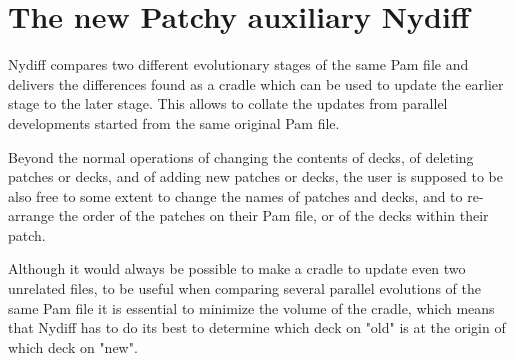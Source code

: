 \section{The new Patchy auxiliary Nydiff}

Nydiff compares two different evolutionary stages of the same
Pam file and delivers the differences found as a cradle which
can be used to update the earlier stage to the later stage.
This allows to collate the updates from parallel developments
started from the same original Pam file.

Beyond the normal operations of changing the contents of decks,
of deleting patches or decks, and of adding new patches or decks,
the user is supposed to be also free to some extent to change
the names of patches and decks, and to re-arrange the order of
the patches on their Pam file, or of the decks within their patch.

Although it would always be possible to make a cradle to update
even two unrelated files, to be useful when comparing several
parallel evolutions of the same Pam file it is essential to
minimize the volume of the cradle, which means that Nydiff has
to do its best to determine which deck on "old" is at the origin
of which deck on "new".

